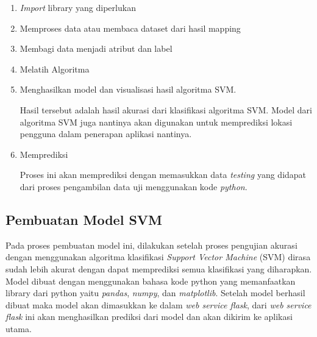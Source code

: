 \begin{enumerate}[1.]
	\itemsep0em
	\item \textit{Import} library yang diperlukan



	\item Memproses data atau membaca dataset dari hasil mapping

	\item Membagi data menjadi atribut dan label

	\item Melatih Algoritma

	\item Menghasilkan model dan visualisasi hasil algoritma SVM.
	      \par Hasil tersebut adalah hasil akurasi dari klasifikasi algoritma SVM. Model dari algoritma SVM juga nantinya akan digunakan untuk memprediksi lokasi pengguna dalam penerapan aplikasi nantinya.

	\item Memprediksi
	      \par Proses ini akan memprediksi dengan memasukkan data \textit{testing} yang didapat dari proses pengambilan data uji menggunakan kode \textit{python}.
\end{enumerate}

\subsection{Pembuatan Model SVM}
Pada proses pembuatan model ini, dilakukan setelah proses pengujian akurasi dengan menggunakan algoritma klasifikasi \textit{Support Vector Machine} (SVM) dirasa sudah lebih akurat dengan dapat memprediksi semua klasifikasi yang diharapkan. Model dibuat dengan menggunakan bahasa kode python yang memanfaatkan library dari python yaitu \textit{pandas}, \textit{numpy}, dan \textit{matplotlib}. Setelah model berhasil dibuat maka model akan dimasukkan ke dalam \textit{web service flask}, dari \textit{web service flask} ini akan menghasilkan prediksi dari model dan akan dikirim ke aplikasi utama.


